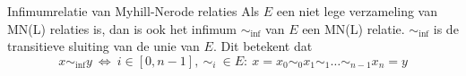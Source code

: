 \begin{lem}{Infimumrelatie van Myhill-Nerode relaties}
    \vspace{-0.1cm}
    Als $E$ een niet lege verzameling van MN(L) relaties is, dan is ook het infimum $\sim_{\text{inf}}$ van $E$ een MN(L) relatie.
    $\sim_{\text{inf}}$ is de transitieve sluiting van de unie van $E$. Dit betekent dat
    \begin{equation*}
        x \sim_{\text{inf}} y \ \Leftrightarrow \ i \in [0, n-1], \ \sim_i \ \in E: \ x = x_0 \sim_0 x_1 \sim_1 \ldots \sim_{n-1} x_n = y
    \end{equation*}
    \vspace{-0.7cm}
\end{lem}


